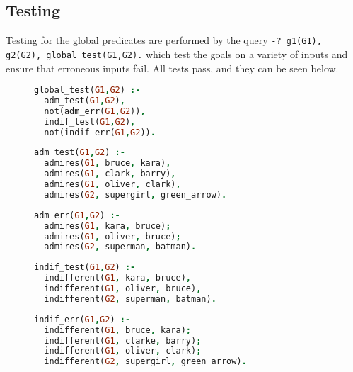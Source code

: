 \documentclass{article}
\begin{document}
\subsection{Testing}
Testing for the global predicates are performed by the query \texttt{-? g1(G1), g2(G2), global\_test(G1,G2).} which test the goals on a variety of inputs and ensure that erroneous inputs fail. All tests pass, and they can be seen below.
\begin{figure}[h!]
\begin{minipage}{0.5\textwidth}
\begin{lstlisting}[language=Prolog]
global_test(G1,G2) :-
  adm_test(G1,G2),
  not(adm_err(G1,G2)),
  indif_test(G1,G2),
  not(indif_err(G1,G2)).
\end{lstlisting}
\end{minipage}
\begin{minipage}{0.5\textwidth}
\begin{lstlisting}[language=Prolog]
adm_test(G1,G2) :-
  admires(G1, bruce, kara),
  admires(G1, clark, barry),
  admires(G1, oliver, clark),
  admires(G2, supergirl, green_arrow).
\end{lstlisting}
\end{minipage}
\end{figure}
\begin{figure}[h!]
\begin{minipage}{0.5\textwidth}
\begin{lstlisting}[language=Prolog]
adm_err(G1,G2) :-
  admires(G1, kara, bruce);
  admires(G1, oliver, bruce);
  admires(G2, superman, batman).
\end{lstlisting}
\end{minipage}
\begin{minipage}{0.5\textwidth}
\begin{lstlisting}[language=Prolog]
indif_test(G1,G2) :-
  indifferent(G1, kara, bruce),
  indifferent(G1, oliver, bruce),
  indifferent(G2, superman, batman).
\end{lstlisting}
\end{minipage}
\end{figure}
\begin{figure}[h!]
\begin{lstlisting}[language=Prolog]
indif_err(G1,G2) :-
  indifferent(G1, bruce, kara);
  indifferent(G1, clarke, barry);
  indifferent(G1, oliver, clark);
  indifferent(G2, supergirl, green_arrow).
\end{lstlisting}
\end{figure}
\end{document}
